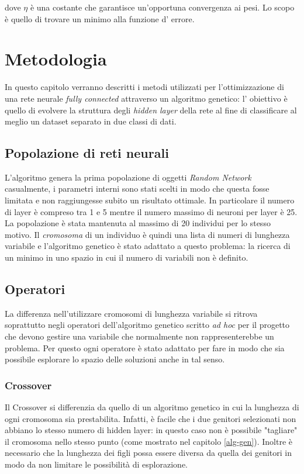 \documentclass[12pt,a4paper]{report}
\begin{document}
dove $\eta$ è una costante che garantisce un'opportuna convergenza ai pesi. 
Lo scopo è quello di trovare un minimo alla funzione d' errore. \cite{backprop}

\chapter{Metodologia}

In questo capitolo verranno descritti i metodi utilizzati per l'ottimizzazione di una rete neurale \textit{fully connected} attraverso un algoritmo genetico: l' obiettivo è quello di evolvere la struttura degli \textit{hidden layer} della rete al fine di classificare al meglio un dataset separato in due classi di dati.

\section{Popolazione di reti neurali}

L'algoritmo genera la prima popolazione di oggetti \textit{Random Network} casualmente, i parametri interni sono stati scelti in modo che questa fosse limitata e non raggiungesse subito un risultato ottimale.
In particolare il numero di layer è compreso tra 1 e 5 mentre il numero massimo di neuroni per layer è 25.
La popolazione è stata mantenuta al massimo di 20 individui per lo stesso motivo.
Il \textit{cromosoma} di un individuo è quindi una lista di numeri di lunghezza variabile e l'algoritmo genetico è stato adattato a questo problema: la ricerca di un minimo in uno spazio in cui il numero di variabili non è definito.

\section{Operatori}

La differenza nell'utilizzare cromosomi di lunghezza variabile si ritrova soprattutto negli operatori dell'algoritmo genetico scritto \textit{ad hoc} per il progetto che devono gestire una variabile che normalmente non rappresenterebbe un problema. 
Per questo ogni operatore è stato adattato per fare in modo che sia possibile esplorare lo spazio delle soluzioni anche in tal senso.

\subsection{Crossover}

Il Crossover si differenzia da quello di un algoritmo genetico in cui la lunghezza di ogni cromosoma sia prestabilita. 
Infatti, è facile che i due genitori selezionati non abbiano lo stesso numero di hidden layer: in questo caso non è possibile "tagliare" il cromosoma nello stesso punto (come mostrato nel capitolo \ref{alg-gen}).
Inoltre è necessario che la lunghezza dei figli possa essere diversa da quella dei genitori in modo da non limitare le possibilità di esplorazione.
\end{document}
